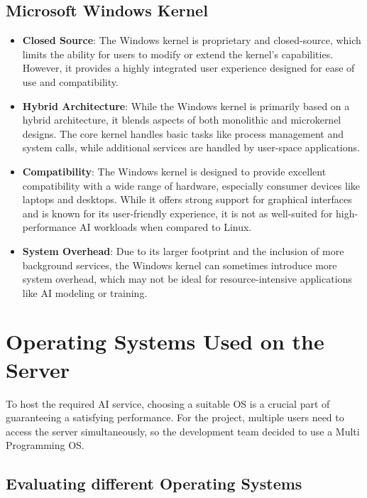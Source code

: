 \subsection{Microsoft Windows Kernel}
\begin{itemize}
    \item \textbf{Closed Source}: The Windows kernel is proprietary and closed-source, which limits the ability for users to modify or extend the kernel's capabilities. However, it provides a highly integrated user experience designed for ease of use and compatibility.
    \item \textbf{Hybrid Architecture}: While the Windows kernel is primarily based on a hybrid architecture, it blends aspects of both monolithic and microkernel designs. The core kernel handles basic tasks like process management and system calls, while additional services are handled by user-space applications.
    \item \textbf{Compatibility}: The Windows kernel is designed to provide excellent compatibility with a wide range of hardware, especially consumer devices like laptops and desktops. While it offers strong support for graphical interfaces and is known for its user-friendly experience, it is not as well-suited for high-performance AI workloads when compared to Linux.
    \item \textbf{System Overhead}: Due to its larger footprint and the inclusion of more background services, the Windows kernel can sometimes introduce more system overhead, which may not be ideal for resource-intensive applications like AI modeling or training.
\end{itemize}

\cite{Kernel}




\section {Operating Systems Used on the Server}

To host the required AI service, choosing a suitable OS is a crucial part of guaranteeing a satisfying performance.
For the project, multiple users need to access the server simultaneously, so the development team decided to use a Multi Programming OS.

\subsection {Evaluating different Operating Systems}

